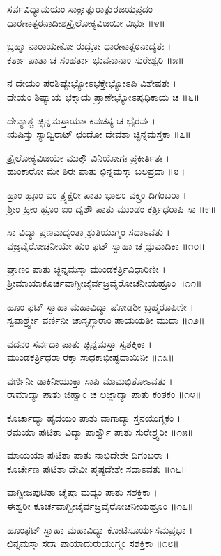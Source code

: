 ಸರ್ವವಿದ್ಯಾಮಯಂ ಸಾಕ್ಷಾತ್ಸುರಾತ್ಸುರಜಯಪ್ರದಂ ।\\
ಧಾರಣಾತ್ಪಠನಾದೀಶಸ್ತ್ರೈಲೋಕ್ಯವಿಜಯೀ ವಿಭುಃ ॥೪॥

ಬ್ರಹ್ಮಾ ನಾರಾಯಣೋ ರುದ್ರೋ ಧಾರಣಾತ್ಪಠನಾದ್ಯತಃ ।\\
ಕರ್ತಾ ಪಾತಾ ಚ ಸಂಹರ್ತಾ ಭುವನಾನಾಂ ಸುರೇಶ್ವರಿ ॥೫॥

ನ ದೇಯಂ ಪರಶಿಷ್ಯೇಭ್ಯೋಽಭಕ್ತೇಭ್ಯೋಽಪಿ ವಿಶೇಷತಃ ।\\
ದೇಯಂ ಶಿಷ್ಯಾಯ ಭಕ್ತಾಯ ಪ್ರಾಣೇಭ್ಯೋಽಪ್ಯಧಿಕಾಯ ಚ ॥೬॥

ದೇವ್ಯಾಶ್ಚ ಚ್ಛಿನ್ನಮಸ್ತಾಯಾಃ ಕವಚಸ್ಯ ಚ ಭೈರವಃ ।\\
ಋಷಿಸ್ತು ಸ್ಯಾದ್ವಿರಾಟ್ ಛಂದೋ ದೇವತಾ ಚ್ಛಿನ್ನಮಸ್ತಕಾ ॥೭॥

ತ್ರೈಲೋಕ್ಯವಿಜಯೇ ಮುಕ್ತೌ ವಿನಿಯೋಗಃ ಪ್ರಕೀರ್ತಿತಃ ।\\
ಹುಂಕಾರೋ ಮೇ ಶಿರಃ ಪಾತು ಛಿನ್ನಮಸ್ತಾ ಬಲಪ್ರದಾ ॥೮॥

ಹ್ರಾಂ ಹ್ರೂಂ ಐಂ ತ್ರ್ಯಕ್ಷರೀ ಪಾತು ಭಾಲಂ ವಕ್ತ್ರಂ ದಿಗಂಬರಾ ।\\
ಶ್ರೀಂ ಹ್ರೀಂ ಹ್ರೂಂ ಐಂ ದೃಶೌ ಪಾತು ಮುಂಡಂ ಕರ್ತ್ರಿಧರಾಪಿ ಸಾ ॥೯॥

ಸಾ ವಿದ್ಯಾ ಪ್ರಣವಾದ್ಯಂತಾ ಶ್ರುತಿಯುಗ್ಮಂ ಸದಾಽವತು ।\\
ವಜ್ರವೈರೋಚನೀಯೇ ಹುಂ ಫಟ್ ಸ್ವಾಹಾ ಚ ಧ್ರುವಾದಿಕಾ ॥೧೦॥

ಘ್ರಾಣಂ ಪಾತು ಚ್ಛಿನ್ನಮಸ್ತಾ ಮುಂಡಕರ್ತ್ರಿವಿಧಾರಿಣೀ ।\\
ಶ್ರೀಮಾಯಾಕೂರ್ಚವಾಗ್ಬೀಜೈರ್ವಜ್ರವೈರೋಚನೀಯಹ್ರೂಂ ॥೧೧॥

ಹೂಂ ಫಟ್ ಸ್ವಾಹಾ ಮಹಾವಿದ್ಯಾ ಷೋಡಶೀ ಬ್ರಹ್ಮರೂಪಿಣೀ ।\\
ಸ್ವಪಾರ್ಶ್ರ್ವೇ ವರ್ಣಿನೀ ಚಾಸೃಗ್ಧಾರಾಂ ಪಾಯಯತೀ ಮುದಾ ॥೧೨॥

ವದನಂ ಸರ್ವದಾ ಪಾತು ಚ್ಛಿನ್ನಮಸ್ತಾ ಸ್ವಶಕ್ತಿಕಾ ।\\
ಮುಂಡಕರ್ತ್ರಿಧರಾ ರಕ್ತಾ ಸಾಧಕಾಭೀಷ್ಟದಾಯಿನೀ ॥೧೩॥

ವರ್ಣಿನೀ ಡಾಕಿನೀಯುಕ್ತಾ ಸಾಪಿ ಮಾಮಭಿತೋಽವತು ।\\
ರಾಮಾದ್ಯಾ ಪಾತು ಜಿಹ್ವಾಂ ಚ ಲಜ್ಜಾದ್ಯಾ ಪಾತು ಕಂಠಕಂ ॥೧೪॥

ಕೂರ್ಚಾದ್ಯಾ ಹೃದಯಂ ಪಾತು ವಾಗಾದ್ಯಾ ಸ್ತನಯುಗ್ಮಕಂ ।\\
ರಮಯಾ ಪುಟಿತಾ ವಿದ್ಯಾ ಪಾರ್ಶ್ವೌ ಪಾತು ಸುರೇಶ್ರ್ವರೀ ॥೧೫॥

ಮಾಯಯಾ ಪುಟಿತಾ ಪಾತು ನಾಭಿದೇಶೇ ದಿಗಂಬರಾ ।\\
ಕೂರ್ಚೇಣ ಪುಟಿತಾ ದೇವೀ ಪೃಷ್ಠದೇಶೇ ಸದಾಽವತು ॥೧೬॥

ವಾಗ್ಬೀಜಪುಟಿತಾ ಚೈಷಾ ಮಧ್ಯಂ ಪಾತು ಸಶಕ್ತಿಕಾ ।\\
ಈಶ್ವರೀ ಕೂರ್ಚವಾಗ್ಬೀಜೈರ್ವಜ್ರವೈರೋಚನೀಯಹ್ರೂಂ ॥೧೭॥

ಹೂಂಫಟ್ ಸ್ವಾಹಾ ಮಹಾವಿದ್ಯಾ ಕೋಟಿಸೂರ್ಯಸಮಪ್ರಭಾ ।\\
ಛಿನ್ನಮಸ್ತಾ ಸದಾ ಪಾಯಾದುರುಯುಗ್ಮಂ ಸಶಕ್ತಿಕಾ ॥೧೮॥

